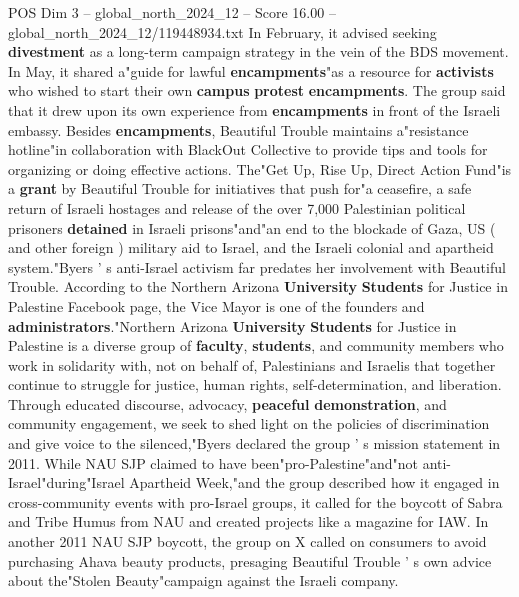 \begin{textsample}{POS Dim 3 – global\_north\_2024\_12 – Score 16.00 – global\_north\_2024\_12/119448934.txt}
In February, it advised seeking \textbf{divestment} as a long-term campaign strategy in the vein of the BDS movement.
In May, it shared a"guide for lawful \textbf{encampments}"as a resource for \textbf{activists} who wished to start their own \textbf{campus} \textbf{protest} \textbf{encampments}.
The group said that it drew upon its own experience from \textbf{encampments} in front of the Israeli embassy.
Besides \textbf{encampments}, Beautiful Trouble maintains a"resistance hotline"in collaboration with BlackOut Collective to provide tips and tools for organizing or doing effective actions.
The"Get Up, Rise Up, Direct Action Fund"is a \textbf{grant} by Beautiful Trouble for initiatives that push for"a ceasefire, a safe return of Israeli hostages and release of the over 7,000 Palestinian political prisoners \textbf{detained} in Israeli prisons"and"an end to the blockade of Gaza, US ( and other foreign ) military aid to Israel, and the Israeli colonial and apartheid system."Byers ' s anti-Israel activism far predates her involvement with Beautiful Trouble.
According to the Northern Arizona \textbf{University} \textbf{Students} for Justice in Palestine Facebook page, the Vice Mayor is one of the founders and \textbf{administrators}."Northern Arizona \textbf{University} \textbf{Students} for Justice in Palestine is a diverse group of \textbf{faculty}, \textbf{students}, and community members who work in solidarity with, not on behalf of, Palestinians and Israelis that together continue to struggle for justice, human rights, self-determination, and liberation.
Through educated discourse, advocacy, \textbf{peaceful} \textbf{demonstration}, and community engagement, we seek to shed light on the policies of discrimination and give voice to the silenced,"Byers declared the group ' s mission statement in 2011.
While NAU SJP claimed to have been"pro-Palestine"and"not anti-Israel"during"Israel Apartheid Week,"and the group described how it engaged in cross-community events with pro-Israel groups, it called for the boycott of Sabra and Tribe Humus from NAU and created projects like a magazine for IAW.
In another 2011 NAU SJP boycott, the group on X called on consumers to avoid purchasing Ahava beauty products, presaging Beautiful Trouble ' s own advice about the"Stolen Beauty"campaign against the Israeli company.

\end{textsample}

